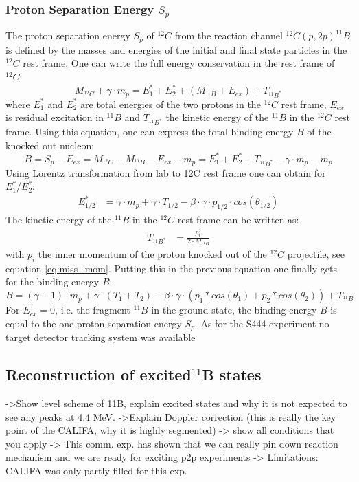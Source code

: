 \subsubsection{Proton Separation Energy $S_p$}
The proton separation energy $S_p$ of $^{12}C$ from the reaction channel $^{12}C(p,2p)^{11}B$ is defined by the masses and energies of the initial and final state particles in the $^{12}C$ rest frame. One can write the full energy conservation in the rest frame of $^{12}C$:
\begin{equation}
M_{^{12}C} + \gamma \cdot m_p = E_1^* + E_2^* + (M_{^{11}B} + E_{ex})  + T_{^{11}B^*}
\end{equation}
where $E_1^*$ and $E_2^*$ are total energies of the two protons in the $^{12}C$ rest frame, $E_{ex}$ is residual excitation in $^{11}B$ and $T_{^{11}B^*}$ the kinetic energy of the $^{11}B$ in the $^{12}C$ rest frame.\newline
Using this equation, one can express the total binding energy $B$ of the knocked out nucleon:
\begin{equation}
B = S_p - E_{ex} = M_{^{12}C} - M_{^{11}B} - E_{ex} - m_p = E_1^* + E_2^* + T_{^{11}B^*} - \gamma \cdot m_p - m_p
\end{equation}
Using Lorentz transformation from lab to 12C rest frame one can obtain for $E_1^*/E_2^*$:
\begin{align*}
E_{1/2}^* &=  \gamma \cdot m_p + \gamma \cdot T_{1/2} - \beta \cdot \gamma \cdot p_{1/2} \cdot cos(\theta_{1/2})
\end{align*}
The kinetic energy of the $^{11}B$ in the $^{12}C$ rest frame can be written as:
\begin{align*}
T_{^{11}B^*} &= \frac{p_i^2}{2 \cdot M_{^{11}B}}
\end{align*}
with $p_i$ the inner momentum of the proton knocked out of the $^{12}C$ projectile, see equation \ref{eq:miss_mom}.
Putting this in the previous equation one finally gets for the binding energy $B$:
\begin{equation}
B = (\gamma - 1)\cdot m_p + \gamma \cdot (T_1+T_2) - \beta \cdot \gamma \cdot(p_1*cos(\theta_1) + p_2*cos(\theta_2)) + T_{^{11}B}
\end{equation}
For $E_{ex} = 0$, i.e. the fragment $^{11}B$ in the ground state, the binding energy $B$ is equal to the one proton separation energy $S_p$. 
As for the S444 experiment no target detector tracking system was available


\subsection{Reconstruction of excited$ ^{11}$B states}
->Show level scheme of 11B, explain excited states and why it is not expected to see any peaks at 4.4 MeV.
->Explain Doppler correction (this is really the key point of the CALIFA, why it is highly segmented)
-> show all conditions that you apply
-> This comm. exp. has shown that we can really pin down reaction mechanism and we are ready for exciting p2p experiments
-> Limitations: CALIFA was only partly filled for this exp. 
